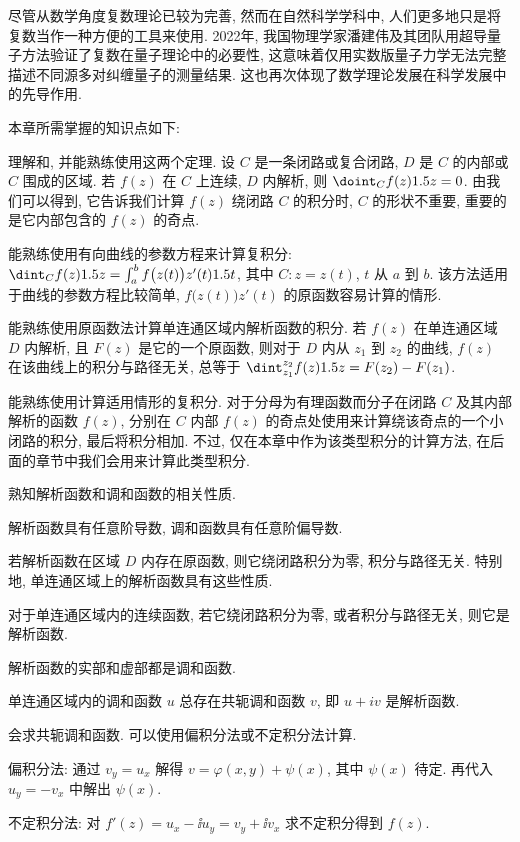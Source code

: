尽管从数学角度复数理论已较为完善, 然而在自然科学学科中, 人们更多地只是将复数当作一种方便的工具来使用.
2022年, 我国物理学家潘建伟及其团队用超导量子方法验证了复数在量子理论中的必要性, 这意味着仅用实数版量子力学无法完整描述不同源多对纠缠量子的测量结果.
这也再次体现了数学理论发展在科学发展中的先导作用.



\startwidepage
{}

本章所需掌握的知识点如下:
\begin{conclusion}
  \item 理解\thmCG 和\thmCCC, 并能熟练使用这两个定理.
  设 $C$ 是一条闭路或复合闭路, $D$ 是 $C$ 的内部或 $C$ 围成的区域.
  若 $f(z)$ 在 $C$ 上连续, $D$ 内解析, 则 $\doint_C f(z)\d z=0$.
  由\thmCCC 我们可以得到\thmCT, 它告诉我们计算 $f(z)$ 绕闭路 $C$ 的积分时, $C$ 的形状不重要, 重要的是它内部包含的 $f(z)$ 的奇点.
  \item 能熟练使用有向曲线的参数方程来计算复积分: $\dint_C f(z)\d z=\int_a^bf\bigl(z(t)\bigr)z'(t)\d t$, 其中 $C:z=z(t)$, $t$ 从 $a$ 到 $b$.
  该方法适用于曲线的参数方程比较简单, $f\bigl(z(t)\bigr)z'(t)$ 的原函数容易计算的情形.
  \item 能熟练使用原函数法计算单连通区域内解析函数的积分.
  若 $f(z)$ 在单连通区域 $D$ 内解析, 且 $F(z)$ 是它的一个原函数, 则对于 $D$ 内从 $z_1$ 到 $z_2$ 的曲线, $f(z)$ 在该曲线上的积分与路径无关, 总等于 $\dint_{z_1}^{z_2}f(z)\d z=F(z_2)-F(z_1)$.
  \item 能熟练使用\thmCIH 计算适用情形的复积分. 对于分母为有理函数而分子在闭路 $C$ 及其内部解析的函数 $f(z)$, 分别在 $C$ 内部 $f(z)$ 的奇点处使用\thmCIH 来计算绕该奇点的一个小闭路的积分, 最后将积分相加.
  不过, \thmCIH 仅在本章中作为该类型积分的计算方法, 在后面的章节中我们会用\thmRes 来计算此类型积分.
  \item 熟知解析函数和调和函数的相关性质.
  \begin{conclusion}
    \item 解析函数具有任意阶导数, 调和函数具有任意阶偏导数.
    \item 若解析函数在区域 $D$ 内存在原函数, 则它绕闭路积分为零, 积分与路径无关. 特别地, 单连通区域上的解析函数具有这些性质.
    \item 对于单连通区域内的连续函数, 若它绕闭路积分为零, 或者积分与路径无关, 则它是解析函数.
    \item 解析函数的实部和虚部都是调和函数.
    \item 单连通区域内的调和函数 $u$ 总存在共轭调和函数 $v$, 即 $u+iv$ 是解析函数.
  \end{conclusion}
  \item 会求共轭调和函数. 可以使用偏积分法或不定积分法计算.
  \begin{conclusion}
    \item 偏积分法: 通过 $v_y=u_x$ 解得 $v=\varphi(x,y)+\psi(x)$, 其中 $\psi(x)$ 待定. 再代入 $u_y=-v_x$ 中解出 $\psi(x)$.
    \item 不定积分法: 对 $f'(z)=u_x-\ii u_y=v_y+\ii v_x$ 求不定积分得到 $f(z)$.
  \end{conclusion}
\end{conclusion}


